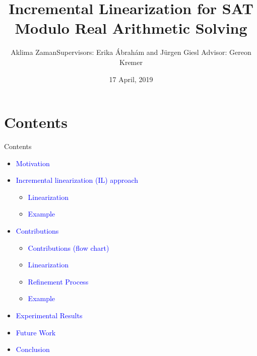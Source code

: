 \documentclass[]{beamer}
\begin{document}
\RWTHtoc

\title[Incremental Linearization for SAT Modulo Real Arithmetic Solving]{Incremental Linearization for SAT Modulo Real Arithmetic Solving}

\author[Aklima Zaman]{\textcolor{RWTHblue}{Aklima Zaman}\linebreak Supervisors: Erika Ábrahám and Jürgen Giesl \linebreak Advisor: Gereon Kremer}

\institute[]{}

\date{17 April, 2019}


\frame{
	\titlepage	
}

\section{Contents}
\begin{frame}{Contents}
    \begin{itemize}
        \item \textcolor<1>{blue}{Motivation}
		\item \textcolor<2>{blue}{Incremental linearization (IL) approach}
		\begin{itemize}
		    \item \textcolor<3>{blue}{Linearization}
		\item \textcolor<4>{blue}{Example}
		\end{itemize}
		\item \textcolor<5>{blue}{Contributions}
		\begin{itemize}
		    \item \textcolor<6>{blue}{Contributions (flow chart)}
		    \item \textcolor<7>{blue}{Linearization}
		    \item \textcolor<8>{blue}{Refinement Process}
		    \item \textcolor<9>{blue}{Example}
		\end{itemize}
		\item \textcolor<10>{blue}{Experimental Results}
		\item \textcolor<11>{blue}{Future Work}
		\item \textcolor<12>{blue}{Conclusion}
    \end{itemize}
\end{frame}
\end{document}
